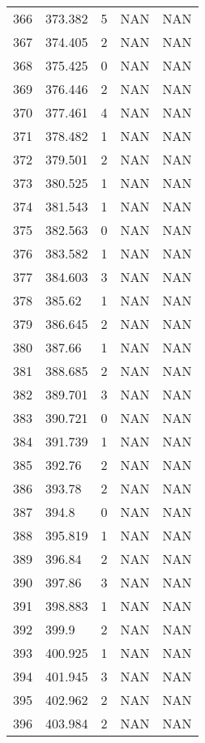 \documentclass{article}
\begin{document}
\begin{longtable}{@{}lllll@{}}
				366 & 373.382 & 5     & NAN   & NAN   \\
				367 & 374.405 & 2     & NAN   & NAN   \\
				368 & 375.425 & 0     & NAN   & NAN   \\
				369 & 376.446 & 2     & NAN   & NAN   \\
				370 & 377.461 & 4     & NAN   & NAN   \\
				371 & 378.482 & 1     & NAN   & NAN   \\
				372 & 379.501 & 2     & NAN   & NAN   \\
				373 & 380.525 & 1     & NAN   & NAN   \\
				374 & 381.543 & 1     & NAN   & NAN   \\
				375 & 382.563 & 0     & NAN   & NAN   \\
				376 & 383.582 & 1     & NAN   & NAN   \\
				377 & 384.603 & 3     & NAN   & NAN   \\
				378 & 385.62  & 1     & NAN   & NAN   \\
				379 & 386.645 & 2     & NAN   & NAN   \\
				380 & 387.66  & 1     & NAN   & NAN   \\
				381 & 388.685 & 2     & NAN   & NAN   \\
				382 & 389.701 & 3     & NAN   & NAN   \\
				383 & 390.721 & 0     & NAN   & NAN   \\
				384 & 391.739 & 1     & NAN   & NAN   \\
				385 & 392.76  & 2     & NAN   & NAN   \\
				386 & 393.78  & 2     & NAN   & NAN   \\
				387 & 394.8   & 0     & NAN   & NAN   \\
				388 & 395.819 & 1     & NAN   & NAN   \\
				389 & 396.84  & 2     & NAN   & NAN   \\
				390 & 397.86  & 3     & NAN   & NAN   \\
				391 & 398.883 & 1     & NAN   & NAN   \\
				392 & 399.9   & 2     & NAN   & NAN   \\
				393 & 400.925 & 1     & NAN   & NAN   \\
				394 & 401.945 & 3     & NAN   & NAN   \\
				395 & 402.962 & 2     & NAN   & NAN   \\
				396 & 403.984 & 2     & NAN   & NAN   \\

\end{longtable}
\end{document}
